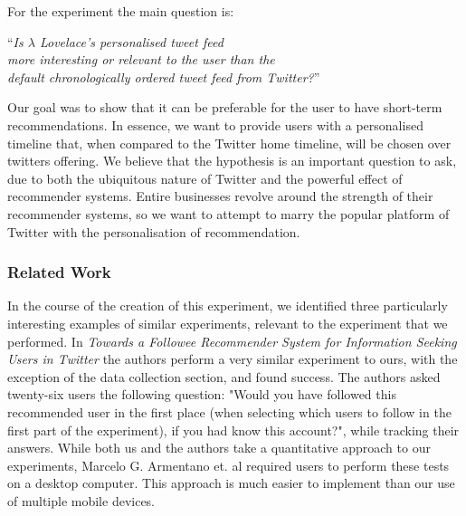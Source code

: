 \documentclass{article}
\begin{document}
For the experiment the main question is: 

\begin{center}
    ``\textit{Is $\lambda$ Lovelace's personalised tweet feed \\
    more interesting or relevant to the user than the \\
    default chronologically ordered tweet feed from Twitter?}''
\end{center}

Our goal was to show that it can be preferable for the user to have short-term recommendations. In essence, we want to provide users with a personalised timeline that, when compared to the Twitter home timeline, will be chosen over twitters offering. We believe that the hypothesis is an important question to ask, due to both the ubiquitous nature of Twitter and the powerful effect of recommender systems. Entire businesses revolve around the strength of their recommender systems, so we want to attempt to marry the popular platform of Twitter with the personalisation of recommendation.

\subsubsection*{Related Work} 
In the course of the creation of this experiment, we identified three particularly interesting examples of similar experiments, relevant to the experiment that we performed. In \textit{Towards a Followee Recommender System for Information Seeking Users in Twitter} \cite{paper1} the authors perform a very similar experiment to ours, with the exception of the data collection section, and found success. The authors asked twenty-six users the following question: "Would you have followed this recommended user in the first place (when selecting which users to follow in the first part of the experiment), if you had know this account?", while tracking their answers. While both us and the authors take a quantitative approach to our experiments, Marcelo G. Armentano et. al required users to perform these tests on a desktop computer. This approach is much easier to implement than our use of multiple mobile devices. 
\end{document}
